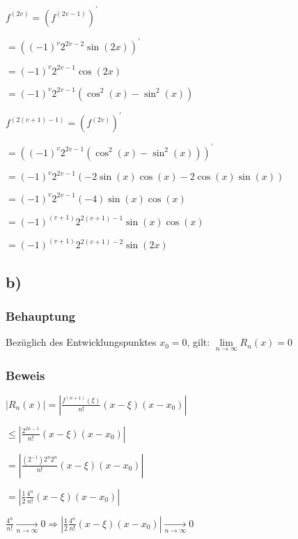 $   f^{(2v)} = (f^{(2v-1)})^{\prime} $

$   = ((-1)^{v} 2^{2v-2} \sin(2x))^{\prime} $

$   = (-1)^{v} 2^{2v-1}\cos(2x) $

$   = (-1)^{v} 2^{2v-1}(\cos^{2}(x)-\sin^{2}(x)) $ \bigskip

$   f^{(2(v+1)-1)} = (f^{(2v)})^{\prime} $

$   = ((-1)^{v} 2^{2v-1}(\cos^{2}(x)-\sin^{2}(x)))^{\prime} $

$   = (-1)^{v} 2^{2v-1}(-2\sin(x)\cos(x)-2\cos(x)\sin(x)) $

$   = (-1)^{v} 2^{2v-1}(-4)\sin(x)\cos(x) $

$   = (-1)^{(v+1)} 2^{2(v+1)-1}\sin(x)\cos(x) $

$   = (-1)^{(v+1)} 2^{2(v+1)-2}\sin(2x) $


\subsection*{b)}

\subsubsection*{Behauptung}

Bezüglich des Entwicklungspunktes $x_{0} = 0$, gilt:
$\lim\limits_{n \to \infty} R_{n}(x) = 0$

\subsubsection*{Beweis}

$ |R_{n}(x)| = |\frac{f^{(n+1)}(\xi)}{n!}(x-\xi)(x-x_{0})| $

$ \leq |\frac{2^{2n-1}}{n!}(x-\xi)(x-x_{0})| $

$ =  |\frac{(2^{-1})2^{n}2^{n}}{n!}(x-\xi)(x-x_{0})| $

$ =  |\frac{1}{2}\frac{4^{n}}{n!}(x-\xi)(x-x_{0})| $

$ \frac{4^{n}}{n!} \xrightarrow[n\to\infty]{} 0 \Rightarrow |\frac{1}{2}\frac{4^{n}}{n!}(x-\xi)(x-x_{0})| \xrightarrow[n\to\infty]{} 0 $
